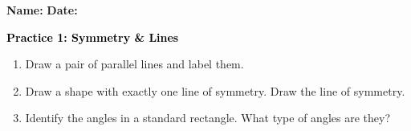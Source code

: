 \documentclass[12pt, letterpaper, fleqn]{article}
\begin{document}
\textbf{Name:} \underline{\hspace{5cm}}
\hfill
\textbf{Date:} \underline{\hspace{3cm}}\\

\begin{tcolorbox}[colback=customteal!20]
    \large\textcolor{black}{\textbf{Practice 1: Symmetry \& Lines}}
\end{tcolorbox}
\begin{enumerate}[itemsep=3.5cm, leftmargin=0.6cm]
\item Draw a pair of parallel lines and label them.
\vspace{3.5cm}
\item Draw a shape with exactly one line of symmetry. Draw the line of symmetry.
\vspace{3.5cm}
\item Identify the angles in a standard rectangle. What type of angles are they?
\end{enumerate}
\end{document}
